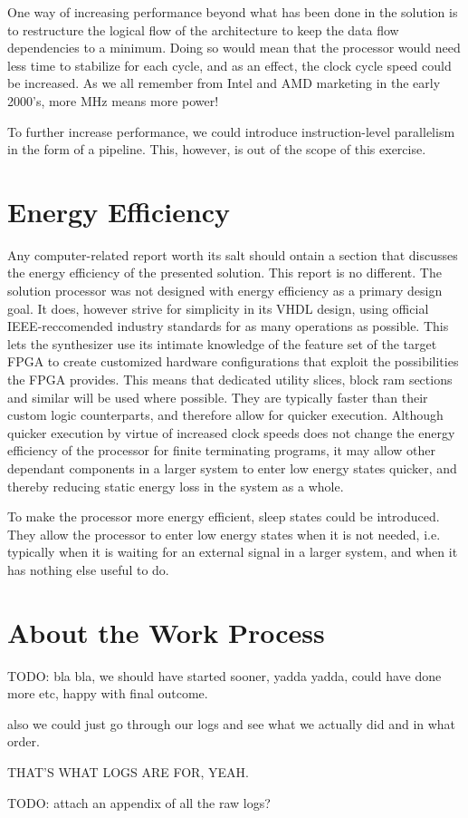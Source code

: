 One way of increasing performance beyond what has been done in the solution is to restructure the logical flow of the architecture to keep the data flow dependencies to a minimum.
Doing so would mean that the processor would need less time to stabilize for each cycle, and as an effect, the clock cycle speed could be increased.
As we all remember from Intel and AMD marketing in the early 2000's, more MHz means more power!

To further increase performance, we could introduce instruction-level parallelism in the form of a pipeline.
This, however, is out of the scope of this exercise.

\section{Energy Efficiency}

Any computer-related report worth its salt should ontain a section that discusses the energy efficiency of the presented solution.
This report is no different.
The solution processor was not designed with energy efficiency as a primary design goal.
It does, however strive for simplicity in its VHDL design, using official IEEE-reccomended industry standards for as many operations as possible.
This lets the synthesizer use its intimate knowledge of the feature set of the target FPGA to create customized hardware configurations that exploit the possibilities the FPGA provides.
This means that dedicated utility slices, block ram sections and similar will be used where possible.
They are typically faster than their custom logic counterparts, and therefore allow for quicker execution.
Although quicker execution by virtue of increased clock speeds does not change the energy efficiency of the processor for finite terminating programs, it may allow other dependant components in a larger system to enter low energy states quicker, and thereby reducing static energy loss in the system as a whole.

To make the processor more energy efficient, sleep states could be introduced.
They allow the processor to enter low energy states when it is not needed, i.e. typically when it is waiting for an external signal in a larger system, and when it has nothing else useful to do.

\section{About the Work Process}

TODO: bla bla, we should have started sooner, yadda yadda, could have done more etc, happy with final outcome.

also we could just go through our logs and see what we actually did and in what order.

THAT'S WHAT LOGS ARE FOR, YEAH.

TODO: attach an appendix of all the raw logs?
